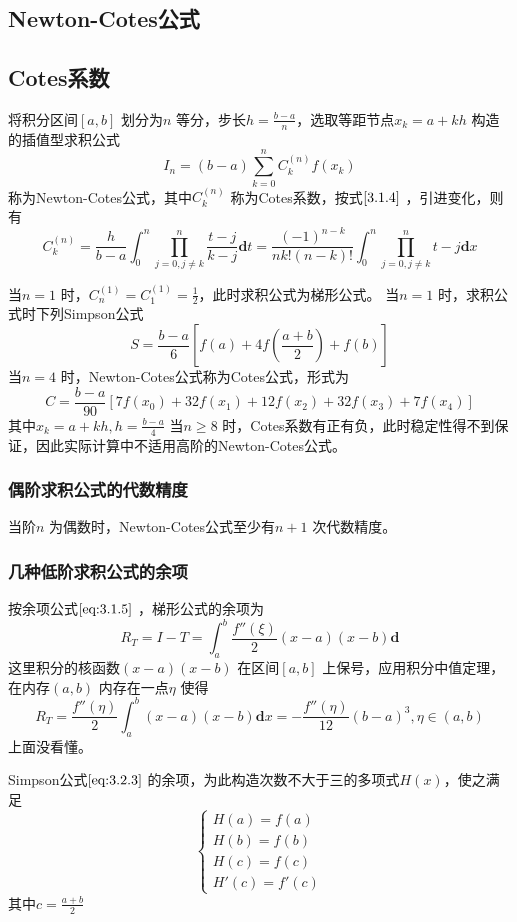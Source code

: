 \documentclass[a4paper]{article}
\begin{document}
\subsection{Newton-Cotes公式}
\subsection{Cotes系数}
将积分区间$[a,b]$ 划分为$n$ 等分，步长$h = \frac{b - a}{n}$，选取等距节点$x_{k} = a + kh$ 构造的插值型求积公式
\[
	I_n = (b - a) \sum_{k=0}^{n} C_k^{(n)} f(x_{k}) \tag{3.2.1} \label{eq:3.2.1}
\] 
称为Newton-Cotes公式，其中$C_k^{(n)}$ 称为Cotes系数，按式$\ref{3.1.4}$ ，引进变化，则有
\[
	C_k^{(n)} = \frac{h}{b - a} \int_{0}^{n} \prod_{j=0,j \neq k}^{n} \frac{t - j}{k - j} \mathbf{d} t = \frac{(-1)^{n-k}}{n k! (n-k)!} \int_{0}^{n} \prod_{j=0, j \neq k}^{n} t - j \mathbf{d} x \tag{3.2.2} \label{eq:3.2.2}
\] 

当$n=1$ 时，$C_n^{(1)} = C_1^{(1)} = \frac{1}{2}$，此时求积公式为梯形公式。
当$n=1$ 时，求积公式时下列Simpson公式
\[
	S = \frac{b-a}{6} [ f(a) + 4 f(\frac{a+b}{2}) + f(b) ] \tag{3.2.3} \label{eq:3.2.3}
\] 
当$n=4$ 时，Newton-Cotes公式称为Cotes公式，形式为
\[
	C = \frac{b - a}{90} [ 7f(x_0) + 32 f(x_1) + 12 f(x_2) + 32 f(x_3) + 7 f(x_4) ] \tag{3.2.4} \label{eq:3.2.4}
\] 
其中$x_k = a + k h, h = \frac{b - a}{4}$
当$n \ge 8$ 时，Cotes系数有正有负，此时稳定性得不到保证，因此实际计算中不适用高阶的Newton-Cotes公式。

\subsubsection{偶阶求积公式的代数精度}
\begin{theorem}
	当阶$n$ 为偶数时，Newton-Cotes公式至少有$n+1$ 次代数精度。
\end{theorem}

\subsubsection{几种低阶求积公式的余项}
按余项公式$\ref{eq:3.1.5}$ ，梯形公式的余项为
\[
R_T = I - T = \int_{a}^{b} \frac{f''(\xi)}{2} (x - a) (x - b) \mathbf{d}  
\] 
这里积分的核函数$(x-a)(x-b)$ 在区间$[a,b]$ 上保号，应用积分中值定理，在内存$(a,b)$ 内存在一点$\eta$ 使得
\[
	R_T = \frac{f''(\eta)}{2} \int_{a}^{b} (x-a)(x-b) \mathbf{d} x = - \frac{f''(\eta)}{12} (b-a)^3, \eta \in (a,b) \tag{3.2.5} \label{eq:3.2.5}
\] 
上面没看懂。

Simpson公式$\ref{eq:3.2.3}$ 的余项，为此构造次数不大于三的多项式$H(x)$，使之满足
\[
	\tag{3.2.6} \label{eq:3.2.6}
	\begin{cases}
		H(a) = f(a) \\
		H(b) = f(b) \\
		H(c) = f(c) \\
		H'(c) = f'(c) 
	\end{cases}
\] 
其中$c = \frac{a + b}{2}$ 
\end{document}
